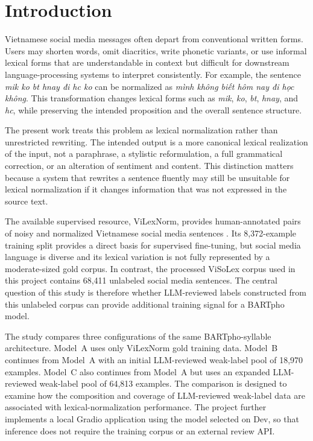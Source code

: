 \documentclass[11pt]{article}
\begin{document}
\section{Introduction}

Vietnamese social media messages often depart from conventional written forms. Users may shorten words, omit diacritics, write phonetic variants, or use informal lexical forms that are understandable in context but difficult for downstream language-processing systems to interpret consistently. For example, the sentence \textit{mik ko bt hnay đi hc ko} can be normalized as \textit{mình không biết hôm nay đi học không}. This transformation changes lexical forms such as \textit{mik}, \textit{ko}, \textit{bt}, \textit{hnay}, and \textit{hc}, while preserving the intended proposition and the overall sentence structure.

The present work treats this problem as lexical normalization rather than unrestricted rewriting. The intended output is a more canonical lexical realization of the input, not a paraphrase, a stylistic reformulation, a full grammatical correction, or an alteration of sentiment and content. This distinction matters because a system that rewrites a sentence fluently may still be unsuitable for lexical normalization if it changes information that was not expressed in the source text.

The available supervised resource, ViLexNorm, provides human-annotated pairs of noisy and normalized Vietnamese social media sentences \citep{nguyen2024vilexnorm}. Its 8,372-example training split provides a direct basis for supervised fine-tuning, but social media language is diverse and its lexical variation is not fully represented by a moderate-sized gold corpus. In contrast, the processed ViSoLex corpus used in this project contains 68,411 unlabeled social media sentences. The central question of this study is therefore whether LLM-reviewed labels constructed from this unlabeled corpus can provide additional training signal for a BARTpho model.

The study compares three configurations of the same BARTpho-syllable architecture. Model~A uses only ViLexNorm gold training data. Model~B continues from Model~A with an initial LLM-reviewed weak-label pool of 18,970 examples. Model~C also continues from Model~A but uses an expanded LLM-reviewed weak-label pool of 64,813 examples. The comparison is designed to examine how the composition and coverage of LLM-reviewed weak-label data are associated with lexical-normalization performance. The project further implements a local Gradio application using the model selected on Dev, so that inference does not require the training corpus or an external review API.
\end{document}
